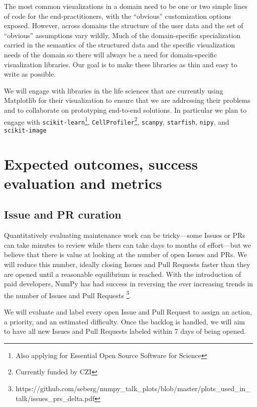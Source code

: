 \documentclass[11pt,letterpaper]{article}  %
\begin{document}
The most common visualizations in a domain need to be one or two
simple lines of code for the end-practitioners, with the ``obvious''
customization options exposed.
However, across domains the structure of the user data and the set of
``obvious'' assumptions vary wildly.  Much of the domain-specific
specialization carried in the semantics of the structured data and the
specific visualization needs of the domain so there will always
be a need for domain-specific visualization libraries.
Our goal is to make these libraries
as thin and easy to write as possible.



We will engage with libraries in the life sciences that are currently
using Matplotlib for their visualization to ensure that we are
addressing their problems and to collaborate on prototyping
end-to-end solutions.
In particular we plan to engage with
\texttt{scikit-learn}\footnote{Also applying for Essential Open Source
Software for Science}, \texttt{CellProfiler}\footnote{Currently funded
by CZI\label{f:czi}}, \texttt{scanpy},
\texttt{starfish}, \texttt{nipy}, and
\texttt{scikit-image}




\section{Expected outcomes, success evaluation and metrics}
\subsection{Issue and PR curation}

Quantitatively evaluating maintenance work can be tricky---some Issues
or PRs can take minutes to review while  thers can take days to
months of effort---but we believe that there is value at looking at
the number of open Issues and PRs.  We will reduce this
number, ideally closing Issues and Pull Requests faster than they are
opened until a reasonable equilibrium is reached.
With the introduction of paid developers,
NumPy has had success in reversing the ever increasing trends
in the number of Issues and Pull Requests
\footnote{https://github.com/seberg/numpy\_talk\_plots/blob/master/plots\_used\_in\_talk/issues\_prs\_delta.pdf}.


We will evaluate and label every open Issue and Pull Request to
assign an action, a priority, and an estimated
difficulty.  Once the backlog is handled, we will aim to have all new Issues and
Pull Requests labeled within 7 days of being opened.
\end{document}
